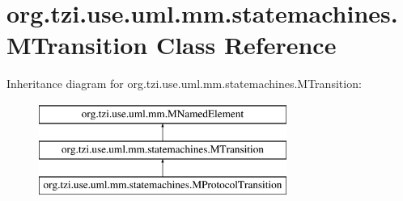 \hypertarget{classorg_1_1tzi_1_1use_1_1uml_1_1mm_1_1statemachines_1_1_m_transition}{\section{org.\-tzi.\-use.\-uml.\-mm.\-statemachines.\-M\-Transition Class Reference}
\label{classorg_1_1tzi_1_1use_1_1uml_1_1mm_1_1statemachines_1_1_m_transition}
}
Inheritance diagram for org.\-tzi.\-use.\-uml.\-mm.\-statemachines.\-M\-Transition\-:\begin{figure}[H]
\begin{center}
\leavevmode
\includegraphics[height=3.000000cm]{classorg_1_1tzi_1_1use_1_1uml_1_1mm_1_1statemachines_1_1_m_transition}
\end{center}
\end{figure}
